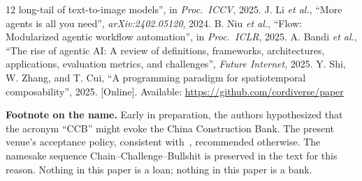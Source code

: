 \documentclass[conference,10pt]{IEEEtran}
\begin{document}
\begin{thebibliography}{12}
long-tail of text-to-image models'', in \emph{Proc.\ ICCV}, 2025.
 J. Li \emph{et al.}, ``More agents is all you
need'', \emph{arXiv:2402.05120}, 2024.
 B. Niu \emph{et al.}, ``Flow: Modularized agentic
workflow automation'', in \emph{Proc.\ ICLR}, 2025.
 A. Bandi \emph{et al.}, ``The rise of agentic
AI: A review of definitions, frameworks, architectures, applications,
evaluation metrics, and challenges'', \emph{Future Internet}, 2025.
 Y. Shi, W. Zhang, and T. Cui, ``A programming
paradigm for spatiotemporal composability'', 2025. [Online]. Available:
\url{https://github.com/cordiverse/paper}
\end{thebibliography}

\vspace{4pt}
\footnotesize
\textbf{Footnote on the name.} Early in preparation, the authors
hypothesized that the acronym ``CCB'' might evoke the China
Construction Bank. The present venue's acceptance policy, consistent
with~\cite{pumera2020,sokal1996}, recommended otherwise. The namesake
sequence Chain--Challenge--Bullshit is preserved in the text for this
reason. Nothing in this paper is a loan; nothing in this paper is a
bank.
\end{document}
